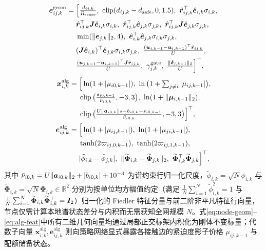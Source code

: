 \begin{equation}
\begin{split}
 \boldsymbol e_{ij,k}^{\mathrm{geom}}&=\Big[\tfrac{d_{ij,k}}{R_{\mathrm{sense}}},\ \clip(d_{ij,k}-\ds,0,1.5),\ \hat{\br}_{ij,k}^{\top}\hat{\be}_{i,k}\sigma_{i,k},\\
 &\quad\ \hat{\br}_{ij,k}^{\top}\bJ\hat{\be}_{i,k}\sigma_{i,k},\ \hat{\br}_{ij,k}^{\top}\hat{\be}_{j,k}\sigma_{j,k},\ \hat{\br}_{ij,k}^{\top}\bJ\hat{\be}_{j,k}\sigma_{j,k},\\
 &\quad\ \min(\norm{\be_{j,k}}_2,4),\ \hat{\be}_{i,k}^{\top}\hat{\be}_{j,k}\sigma_{i,k}\sigma_{j,k},\\
 &\quad\ (\bJ\hat{\be}_{i,k})^{\top}\hat{\be}_{j,k}\sigma_{i,k}\sigma_{j,k},\ \tfrac{(\bu_{j,k-1}-\bu_{i,k-1})^{\top}\hat{\br}_{ij,k}}{U},\\
 &\quad\ \tfrac{(\bu_{j,k-1}-\bu_{i,k-1})^{\top}\bJ\hat{\br}_{ij,k}}{U},\ \gamma_{j,k}^{\mathrm{gate}},\ \tfrac{\norm{\boldsymbol\delta_{j,k-1}}_2}{U}\Big]^{\top},
\end{split}\label{eq:edge-geom}
\end{equation}
\begin{equation}
\begin{split}
 \boldsymbol x_{i,k}^{\mathrm{alg}}&=\Big[\ln(1+|\mu_{i0,k-1}|),\ \ln\big(1+\textstyle\sum_{j\ne i}|\mu_{ij,k-1}|\big),\\
 &\quad\ \clip\big(\tfrac{s_{i0,k-1}}{\bar\nu_{i0,k}},-3,3\big),\ \ln(1+\norm{\boldsymbol\mu_{i,k-1}}_2),\\
 &\quad\ \clip\big(\tfrac{U\norm{\boldsymbol a_{i0,k}}_2-b_{i0,k}-s_{i0,k-1}}{\bar\nu_{i0,k}},-3,3\big)\Big]^{\top},\\
 \boldsymbol e_{ij,k}^{\mathrm{alg}}&=\Big[\ln(1+|\mu_{ij,k-1}|),\ \ln(1+|\mu_{ji,k-1}|),\\
 &\quad\ \tanh(2\varpi_{ij,0,k-1}),\ \tanh(2\varpi_{ij,1,k-1}),\\
 &\quad\ |\tilde\phi_{i,k}-\tilde\phi_{j,k}|,\ \norm{\widetilde{\boldsymbol\Phi}_{i,k}-\widetilde{\boldsymbol\Phi}_{j,k}}_2,\ \widetilde{\boldsymbol\Phi}_{i,k}^{\top}\widetilde{\boldsymbol\Phi}_{j,k}\Big]^{\top},
\end{split}\label{eq:alg-feat}
\end{equation}
其中 $\bar\nu_{i0,k}=U\lVert\boldsymbol a_{i0,k}\rVert_2+|b_{i0,k}|+10^{-3}$ 为谱约束行归一化尺度，$\tilde\phi_{i,k}=\sqrt{N}\phi_{i,k}$ 与 $\widetilde{\boldsymbol\Phi}_{i,k}=\sqrt{N}\boldsymbol\Phi_{i,k}\in\mathbb R^2$ 分别为按单位均方幅值约定（满足 $\frac1N\sum_{i=1}^N\tilde\phi_{i,k}^2=1$ 与 $\frac1N\sum_{i=1}^N\widetilde{\boldsymbol\Phi}_{i,k}\widetilde{\boldsymbol\Phi}_{i,k}^{\top}=\boldsymbol{I}_2$）归一化的 Fiedler 特征分量与前二阶非平凡特征行向量，节点仅需计算本地谱状态差分与内积而无需获知全网规模 $N$。式\eqref{eq:node-geom}--\eqref{eq:alg-feat}中所有二维几何向量均通过局部正交标架内积化为刚体不变标量；代数子向量 $\boldsymbol x_{i,k}^{\mathrm{alg}},\boldsymbol e_{ij,k}^{\mathrm{alg}}$ 则向策略网络显式暴露各接触边的紧迫度影子价格 $\mu_{ij,k-1}$ 与配额储备状态。

